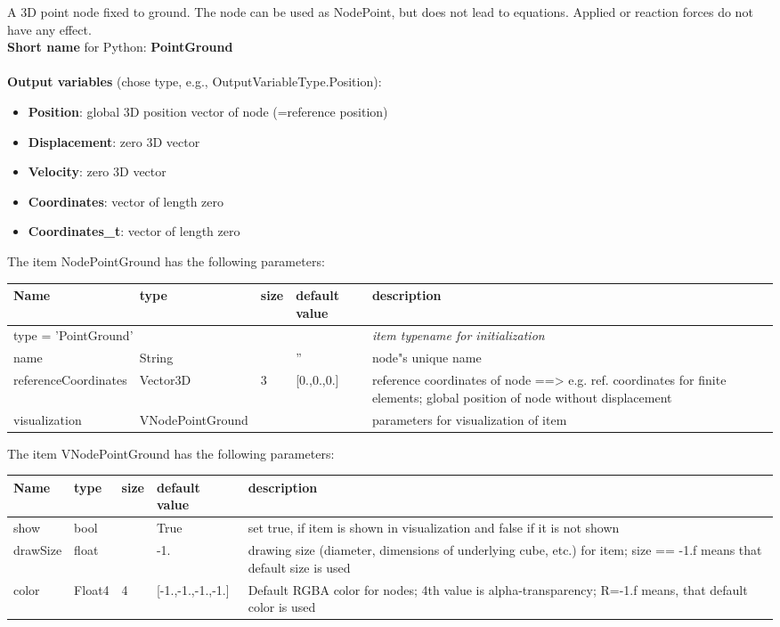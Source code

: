 A 3D point node fixed to ground. The node can be used as NodePoint, but does not lead to equations. Applied or reaction forces do not have any effect.
 \\
{\bf Short name} for Python: {\bf PointGround}
 \\\\ 
{\bf Output variables} (chose type, e.g., OutputVariableType.Position): 
\begin{itemize}
    \item {\bf Position}: global 3D position vector of node (=reference position)
    \item {\bf Displacement}: zero 3D vector
    \item {\bf Velocity}: zero 3D vector
    \item {\bf Coordinates}: vector of length zero
    \item {\bf Coordinates\_t}: vector of length zero
\end{itemize}
The item NodePointGround has the following parameters:
\begin{center}
  \footnotesize
  \begin{longtable}{| p{4.5cm} | p{2.5cm} | p{0.5cm} | p{2.5cm} | p{6cm} |}
    \hline
    \bf Name & \bf type & \bf size & \bf default value & \bf description \\ \hline
    \multicolumn{4}{l}{\parbox{10cm}{type = 'PointGround'}} & \multicolumn{1}{l}{\parbox{6cm}{\it item typename for initialization}}\\ \hline
    name &     String &      &     '' &     node"s unique name\\ \hline
    referenceCoordinates &     Vector3D &     3 &     [0.,0.,0.] &     reference coordinates of node ==> e.g. ref. coordinates for finite elements; global position of node without displacement\\ \hline
    visualization & VNodePointGround & & & parameters for visualization of item \\ \hline
	  \end{longtable}
	\end{center}
The item VNodePointGround has the following parameters:
\begin{center}
  \footnotesize
  \begin{longtable}{| p{4.5cm} | p{2.5cm} | p{0.5cm} | p{2.5cm} | p{6cm} |}
    \hline
    \bf Name & \bf type & \bf size & \bf default value & \bf description \\ \hline
    show &     bool &      &     True &     set true, if item is shown in visualization and false if it is not shown\\ \hline
    drawSize &     float &      &     -1. &     drawing size (diameter, dimensions of underlying cube, etc.)  for item; size == -1.f means that default size is used\\ \hline
    color &     Float4 &     4 &     [-1.,-1.,-1.,-1.] &     Default RGBA color for nodes; 4th value is alpha-transparency; R=-1.f means, that default color is used\\ \hline
	  \end{longtable}
	\end{center}

